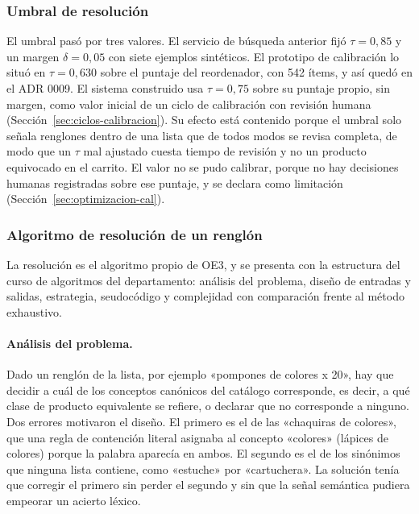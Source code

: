 \subsubsection{Umbral de resolución}

El umbral pasó por tres valores. El servicio de búsqueda anterior fijó $\tau=0{,}85$ y un margen
$\delta=0{,}05$ con siete ejemplos sintéticos. El prototipo de calibración lo situó en $\tau=0{,}630$
sobre el puntaje del reordenador, con 542 ítems, y así quedó en el ADR 0009. El sistema construido
usa $\tau=0{,}75$ sobre su puntaje propio, sin margen, como valor inicial de un ciclo de calibración
con revisión humana (Sección~\ref{sec:ciclos-calibracion}). Su efecto está contenido porque el umbral
solo señala renglones dentro de una lista que de todos modos se revisa completa, de modo que un
$\tau$ mal ajustado cuesta tiempo de revisión y no un producto equivocado en el carrito. El valor no
se pudo calibrar, porque no hay decisiones humanas registradas sobre ese puntaje, y se declara como
limitación (Sección~\ref{sec:optimizacion-cal}).

\subsubsection{Algoritmo de resolución de un renglón}
\label{sec:algoritmo-resolucion}

La resolución es el algoritmo propio de OE3, y se presenta con la estructura del curso de
algoritmos del departamento: análisis del problema, diseño de entradas y salidas, estrategia,
seudocódigo y complejidad con comparación frente al método exhaustivo.

\paragraph{Análisis del problema.} Dado un renglón de la lista, por ejemplo «pompones de colores
x 20», hay que decidir a cuál de los conceptos canónicos del catálogo corresponde, es decir, a qué
clase de producto equivalente se refiere, o declarar que no corresponde a ninguno. Dos errores
motivaron el diseño. El primero es el de las «chaquiras de colores», que una regla de contención
literal asignaba al concepto «colores» (lápices de colores) porque la palabra aparecía en ambos. El
segundo es el de los sinónimos que ninguna lista contiene, como «estuche» por «cartuchera». La
solución tenía que corregir el primero sin perder el segundo y sin que la señal semántica pudiera
empeorar un acierto léxico.

